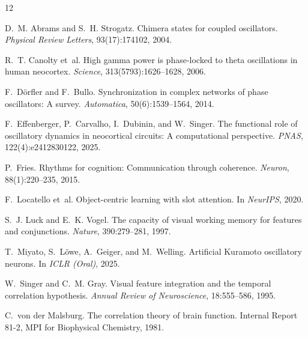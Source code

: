 \documentclass[11pt]{article}
\begin{document}
\begin{thebibliography}{12}

D.~M. Abrams and S.~H. Strogatz.
\newblock Chimera states for coupled oscillators.
\newblock \emph{Physical Review Letters}, 93(17):174102, 2004.

R.~T. Canolty et~al.
\newblock High gamma power is phase-locked to theta oscillations in human neocortex.
\newblock \emph{Science}, 313(5793):1626--1628, 2006.

F.~D\"orfler and F.~Bullo.
\newblock Synchronization in complex networks of phase oscillators: {A} survey.
\newblock \emph{Automatica}, 50(6):1539--1564, 2014.

F.~Effenberger, P.~Carvalho, I.~Dubinin, and W.~Singer.
\newblock The functional role of oscillatory dynamics in neocortical
  circuits: A computational perspective.
\newblock \emph{PNAS}, 122(4):e2412830122, 2025.

P.~Fries.
\newblock Rhythms for cognition: Communication through coherence.
\newblock \emph{Neuron}, 88(1):220--235, 2015.

F.~Locatello et~al.
\newblock Object-centric learning with slot attention.
\newblock In \emph{NeurIPS}, 2020.

S.~J. Luck and E.~K. Vogel.
\newblock The capacity of visual working memory for features and conjunctions.
\newblock \emph{Nature}, 390:279--281, 1997.

T.~Miyato, S.~L\"owe, A.~Geiger, and M.~Welling.
\newblock Artificial {K}uramoto oscillatory neurons.
\newblock In \emph{ICLR (Oral)}, 2025.

W.~Singer and C.~M. Gray.
\newblock Visual feature integration and the temporal correlation hypothesis.
\newblock \emph{Annual Review of Neuroscience}, 18:555--586, 1995.

C.~von der Malsburg.
\newblock The correlation theory of brain function.
\newblock Internal Report 81-2, MPI for Biophysical Chemistry, 1981.

\end{thebibliography}
\end{document}
